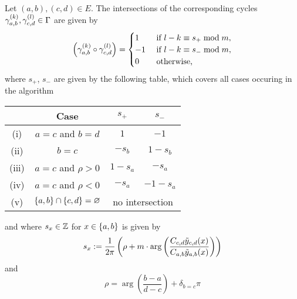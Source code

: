 \documentclass[main.tex]{subfiles}
\begin{document}
   \begin{thm}\label{thm:intsec_numb}
      Let $(a,b),(c,d) \in E$. The intersections of the corresponding cycles $\gamma_{a,b}^{(k)}, \gamma_{c,d}^{(l)} \in \Gamma$ are given by
      \begin{equation}
          \left(\gamma_{a,b}^{(k)} \circ \gamma_{c,d}^{(l)}\right)
          = \begin{cases}
              1  &\text{ if } l-k \equiv s_+ \bmod m,\\
              -1 &\text{ if } l-k \equiv s_- \bmod m,\\
              0 &\text{ otherwise,}
          \end{cases}
      \end{equation}
      where $s_+$, $s_-$ are given by the following table, which covers all
      cases occuring in the algorithm
      \begin{center}
      \begin{tabular}{c|ccc}
          \toprule
          & Case & $s_+$ & $s_-$ \\
          \midrule
         (i) & $a=c$ and $b=d$ & $1$ & $-1$ \\
         (ii) & $b=c$ & $-s_b$ & $1-s_b$ \\
         (iii) & $a=c$ and $\rho>0$ & $1-s_a$ & $-s_a$ \\
         (iv) & $a=c$ and $\rho<0$ & $-s_a$ & $-1-s_a$\\
         (v) & $\left\{a,b\right\}\cap\left\{c,d\right\}=\varnothing$ & \multicolumn{2}{c}{no intersection} \\
          \bottomrule
      \end{tabular}
      \end{center}
      and where $s_x \in \mathbb{Z}$ for $x\in\left\{a,b\right\}$ is given by
      \begin{equation}\label{eq:s_x}
	    s_x := \frac{1}{2\pi}\left( \rho + m \cdot \arg \left( \frac{C_{c,d} \tilde{y}_{c,d}(x)}{C_{a,b}\tilde{y}_{a,b}(x)} \right) 
	    \right)
      \end{equation}
     and
      \begin{equation}
          \rho = \arg \left( \frac{b-a}{d-c} \right) + \delta_{b=c}\pi
      \end{equation}
 \end{thm}
 
\end{document}
